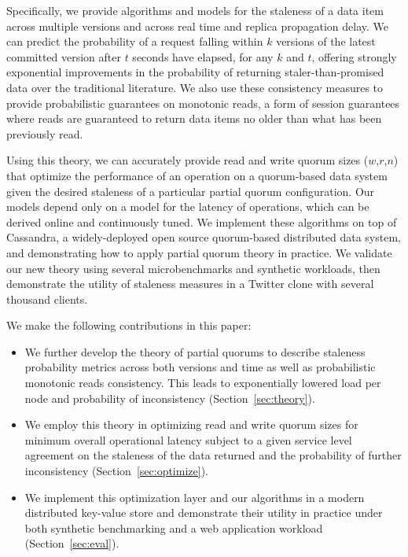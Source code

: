 \documentclass{vldb}
\begin{document}
Specifically, we provide algorithms and models for the staleness of a
data item across multiple versions and across real time and replica
propagation delay.  We can predict the probability of a request
falling within $k$ versions of the latest committed version after $t$
seconds have elapsed, for any $k$ and $t$, offering strongly
exponential improvements in the probability of returning
staler-than-promised data over the traditional literature.  We also
use these consistency measures to provide probabilistic guarantees on
monotonic reads, a form of session guarantees where reads are
guaranteed to return data items no older than what has been previously
read.

Using this theory, we can accurately provide read and write quorum
sizes ($w$,$r$,$n$) that optimize the performance of an operation on a
quorum-based data system given the desired staleness of a particular
partial quorum configuration.  Our models depend only on a model for
the latency of operations, which can be derived online and
continuously tuned.  We implement these algorithms on top of
Cassandra, a widely-deployed open source quorum-based distributed
data system, and demonstrating how to apply partial quorum theory in
practice.  We validate our new theory using several microbenchmarks
and synthetic workloads, then demonstrate the utility of staleness
measures in a Twitter clone with several thousand clients.

We make the following contributions in this paper:

\begin{itemize}

\item We further develop the theory of partial quorums to describe
  staleness probability metrics across both versions and time as well
  as probabilistic monotonic reads consistency.  This leads to
  exponentially lowered load per node and probability of
  inconsistency (Section~\ref{sec:theory}).

\item We employ this theory in optimizing read and write quorum sizes
  for minimum overall operational latency subject to a given
  service level agreement on the staleness of the data returned and
  the probability of further inconsistency (Section~\ref{sec:optimize}).

\item We implement this optimization layer and our algorithms in a
  modern distributed key-value store and demonstrate their utility in
  practice under both synthetic benchmarking and a web application
  workload (Section~\ref{sec:eval}).

\end{itemize}
\end{document}
